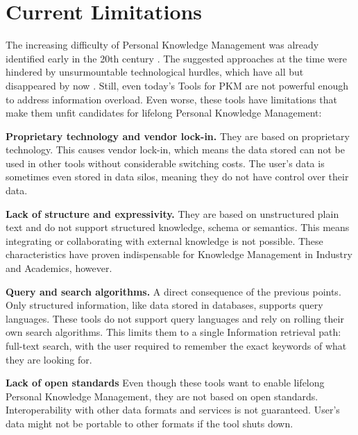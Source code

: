 
\section{Current Limitations}
The increasing difficulty of Personal Knowledge Management was already identified early in the 20th century \cite{Bush1945Memex, Engelbart1962AHI}. The suggested approaches at the time were hindered by unsurmountable technological hurdles, which have all but disappeared by now \cite{Davies2005Memex60}. Still, even today's Tools for PKM are not powerful enough to address information overload. Even worse, these tools have limitations that make them unfit candidates for lifelong Personal Knowledge Management:

    \textbf{Proprietary technology and vendor lock-in.} They are based on proprietary technology. This causes vendor lock-in, which means the data stored can not be used in other tools without considerable switching costs. The user's data is sometimes even stored in data silos, meaning they do not have control over their data.

    \textbf{Lack of structure and expressivity.} They are based on unstructured plain text and do not support structured knowledge, schema or semantics. This means integrating or collaborating with external knowledge is not possible. These characteristics have proven indispensable for Knowledge Management in Industry and Academics, however. 
    
    \textbf{Query and search algorithms.} A direct consequence of the previous points. Only structured information, like data stored in databases, supports query languages. These tools do not support query languages and rely on rolling their own search algorithms. This limits them to a single Information retrieval path: full-text search, with the user required to remember the exact keywords of what they are looking for.
    
    \textbf{Lack of open standards} Even though these tools want to enable lifelong Personal Knowledge Management, they are not based on open standards. Interoperability with other data formats and services is not guaranteed. User's data might not be portable to other formats if the tool shuts down.

